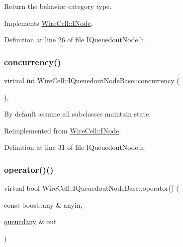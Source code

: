 Return the behavior category type. 



Implements \hyperlink{class_wire_cell_1_1_i_node_a58c07f15b165e5fb33bbc7b2e047b39b}{Wire\+Cell\+::\+I\+Node}.



Definition at line 26 of file I\+Queuedout\+Node.\+h.

\mbox{\label{class_wire_cell_1_1_i_queuedout_node_base_aac268591658fea147722dccd6cb5e3a2}} 
\subsubsection{\texorpdfstring{concurrency()}{concurrency()}}
{\footnotesize\ttfamily virtual int Wire\+Cell\+::\+I\+Queuedout\+Node\+Base\+::concurrency (\begin{DoxyParamCaption}{ }\end{DoxyParamCaption})\hspace{0.3cm}{\ttfamily [inline]}, {\ttfamily [virtual]}}



By default assume all subclasses maintain state. 



Reimplemented from \hyperlink{class_wire_cell_1_1_i_node_a87d2b7293da4f6955e389ac6a2011306}{Wire\+Cell\+::\+I\+Node}.



Definition at line 31 of file I\+Queuedout\+Node.\+h.

\mbox{\label{class_wire_cell_1_1_i_queuedout_node_base_ad3723d92a4594fc9e3d6718fc0de9b1c}} 
\subsubsection{\texorpdfstring{operator()()}{operator()()}}
{\footnotesize\ttfamily virtual bool Wire\+Cell\+::\+I\+Queuedout\+Node\+Base\+::operator() (\begin{DoxyParamCaption}\item[{const boost\+::any \&}]{anyin,  }\item[{\hyperlink{class_wire_cell_1_1_i_queuedout_node_base_a9c144f13ef75e051847fe22888977a11}{queuedany} \&}]{out }\end{DoxyParamCaption})\hspace{0.3cm}{\ttfamily [pure virtual]}}



